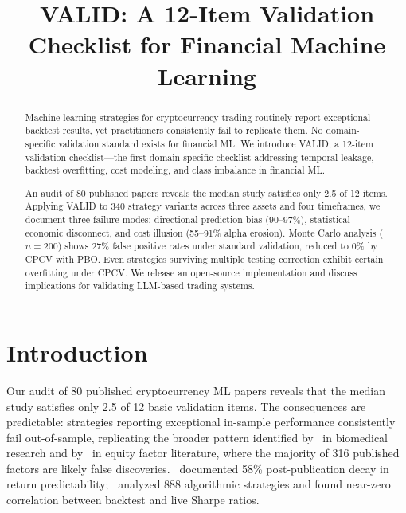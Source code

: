 \documentclass[sigconf,anonymous,review]{acmart}
\begin{document}
\title{VALID: A 12-Item Validation Checklist for Financial Machine Learning}

\begin{abstract}
Machine learning strategies for cryptocurrency trading routinely
report exceptional backtest results, yet practitioners consistently
fail to replicate them. No domain-specific validation standard
exists for financial ML. We introduce VALID, a 12-item validation
checklist---the first domain-specific checklist addressing temporal
leakage, backtest overfitting, cost modeling, and class imbalance
in financial ML.

An audit of 80 published papers reveals the median study satisfies
only 2.5 of 12 items. Applying VALID to 340 strategy variants
across three assets and four timeframes, we document three failure
modes: directional prediction bias (90--97\%), statistical-economic
disconnect, and cost illusion (55--91\% alpha erosion). Monte Carlo
analysis ($n=200$) shows 27\% false positive rates under standard
validation, reduced to 0\% by CPCV with PBO. Even strategies
surviving multiple testing correction exhibit certain overfitting
under CPCV. We release an open-source implementation and discuss
implications for validating LLM-based trading systems.
\end{abstract}


\maketitle

\section{Introduction}
\label{sec:intro}

Our audit of 80 published cryptocurrency ML papers reveals that the
median study satisfies only 2.5 of 12 basic validation items. The
consequences are predictable: strategies reporting exceptional in-sample
performance consistently fail out-of-sample, replicating the broader
pattern identified by~\citet{ioannidis2005false} in biomedical research
and by~\citet{harvey2016cross} in equity factor literature, where the
majority of 316 published factors are likely false
discoveries.~\citet{mclean2016academic} documented 58\% post-publication
decay in return predictability;~\citet{wiecki2016glitters} analyzed 888
algorithmic strategies and found near-zero correlation between backtest
and live Sharpe ratios.
\end{document}
